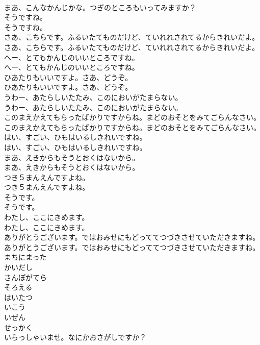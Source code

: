 \documentclass[8pt]{extreport}
\begin{document}
\begin{CJK}{UTF8}{min}
\\	まあ、こんなかんじかな。つぎのところもいってみますか？
\\	そうですね。
\\	そうですね。
\\	さあ、こちらです。ふるいたてものだけど、ていれれされてるからきれいだよ。
\\	さあ、こちらです。ふるいたてものだけど、ていれれされてるからきれいだよ。
\\	へー、とてもかんじのいいところですね。
\\	へー、とてもかんじのいいところですね。
\\	ひあたりもいいですよ。さあ、どうぞ。
\\	ひあたりもいいですよ。さあ、どうぞ。
\\	うわー、あたらしいたたみ、このにおいがたまらない。
\\	うわー、あたらしいたたみ、このにおいがたまらない。
\\	このまえかえてもらったばかりですからね。まどのおそとをみてごらんなさい。
\\	このまえかえてもらったばかりですからね。まどのおそとをみてごらんなさい。
\\	はい、すごい、ひもはいるしきれいですね。
\\	はい、すごい、ひもはいるしきれいですね。
\\	まあ、えきからもそうとおくはないから。
\\	まあ、えきからもそうとおくはないから。
\\	つき５まんえんですよね。
\\	つき５まんえんですよね。
\\	そうです。
\\	そうです。
\\	わたし、ここにきめます。
\\	わたし、ここにきめます。
\\	ありがとうございます。ではおみせにもどっててつづきさせていただきますね。
\\	ありがとうございます。ではおみせにもどっててつづきさせていただきますね。
\\	まちにまった
\\	かいだし
\\	さんぽがてら
\\	そろえる
\\	はいたつ
\\	いこう
\\	いぜん
\\	せっかく
\\	いらっしゃいませ。なにかおさがしですか？

\end{CJK}
\end{document}
